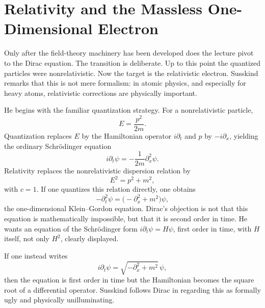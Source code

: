 \section{Relativity and the Massless One-Dimensional Electron}

Only after the field-theory machinery has been developed does the lecture pivot to the Dirac equation. The transition is deliberate. Up to this point the quantized particles were nonrelativistic. Now the target is the relativistic electron. Susskind remarks that this is not mere formalism: in atomic physics, and especially for heavy atoms, relativistic corrections are physically important.

He begins with the familiar quantization strategy. For a nonrelativistic particle,
\begin{equation}
E=\frac{p^2}{2m}.
\end{equation}
Quantization replaces \(E\) by the Hamiltonian operator \(i\partial_t\) and \(p\) by \(-i\partial_x\), yielding the ordinary Schr\"odinger equation
\begin{equation}
i\partial_t\psi=-\frac{1}{2m}\partial_x^2\psi.
\end{equation}
Relativity replaces the nonrelativistic dispersion relation by
\begin{equation}
E^2=p^2+m^2,
\end{equation}
with \(c=1\). If one quantizes this relation directly, one obtains
\begin{equation}
-\partial_t^2\psi=\bigl(-\partial_x^2+m^2\bigr)\psi,
\end{equation}
the one-dimensional Klein--Gordon equation. Dirac's objection is not that this equation is mathematically impossible, but that it is second order in time. He wants an equation of the Schr\"odinger form \(i\partial_t\psi=H\psi\), first order in time, with \(H\) itself, not only \(H^2\), clearly displayed.

If one instead writes
\begin{equation}
i\partial_t\psi=\sqrt{-\partial_x^2+m^2}\,\psi,
\end{equation}
then the equation is first order in time but the Hamiltonian becomes the square root of a differential operator. Susskind follows Dirac in regarding this as formally ugly and physically unilluminating.

